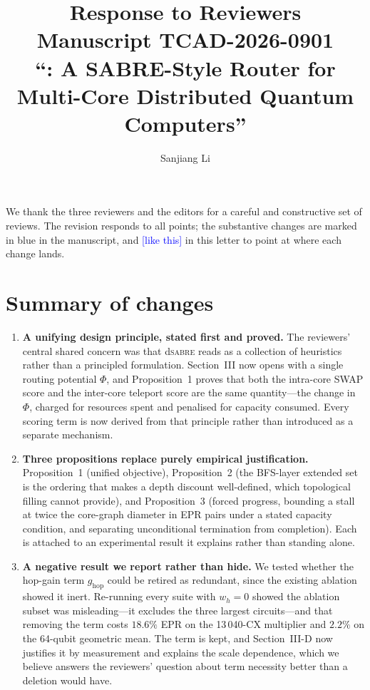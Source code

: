 \documentclass[11pt]{article}
\title{Response to Reviewers\\[2pt]
\large Manuscript TCAD-2026-0901\\
``\dSABRE{}: A SABRE-Style Router for Multi-Core Distributed Quantum
Computers''}
\author{Sanjiang Li}
\date{}
\newcommand{\dSABRE}{d\textsc{sabre}}
\newcommand{\where}[1]{\textcolor{blue}{[#1]}}
\begin{document}
\maketitle

\noindent
We thank the three reviewers and the editors for a careful and
constructive set of reviews.  The revision responds to all points; the
substantive changes are marked in blue in the manuscript, and
\where{like this} in this letter to point at where each change lands.

\section*{Summary of changes}

\begin{enumerate}[leftmargin=*]

\item \textbf{A unifying design principle, stated first and proved.}
The reviewers' central shared concern was that \dSABRE{} reads as a
collection of heuristics rather than a principled formulation.
Section~III now opens with a single routing potential $\Phi$, and
Proposition~1 proves that both the intra-core SWAP score and the
inter-core teleport score are the same quantity---the change in $\Phi$,
charged for resources spent and penalised for capacity consumed.  Every
scoring term is now derived from that principle rather than introduced
as a separate mechanism.

\item \textbf{Three propositions replace purely empirical
justification.}  Proposition~1 (unified objective), Proposition~2 (the
BFS-layer extended set is the ordering that makes a depth discount
well-defined, which topological filling cannot provide), and
Proposition~3 (forced progress, bounding a stall at twice the
core-graph diameter in EPR pairs under a stated capacity condition,
and separating unconditional termination from completion).  Each is attached to an
experimental result it explains rather than standing alone.

\item \textbf{A negative result we report rather than hide.}  We tested
whether the hop-gain term $g_\mathrm{hop}$ could be retired as
redundant, since the existing ablation showed it inert.  Re-running
every suite with $w_h{=}0$ showed the ablation subset was
misleading---it excludes the three largest circuits---and that removing
the term costs $18.6\%$ EPR on the 13\,040-CX multiplier and $2.2\%$ on
the 64-qubit geometric mean.  The term is kept, and Section~III-D now
justifies it by measurement and explains the scale dependence, which we
believe answers the reviewers' question about term necessity better
than a deletion would have.


\end{enumerate}
\end{document}
